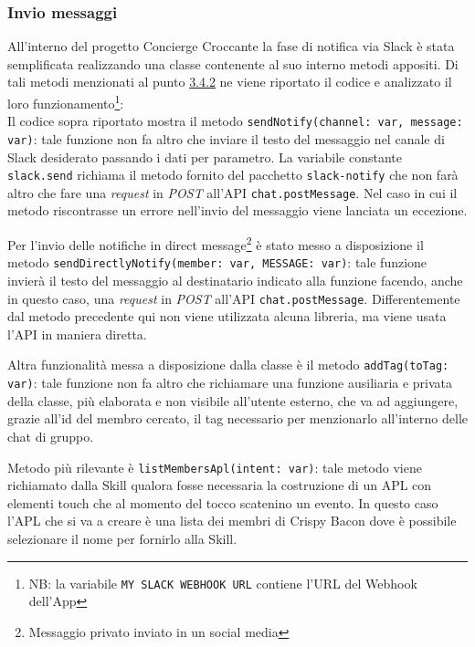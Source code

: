 \subsubsection{Invio messaggi}
All'interno del progetto Concierge Croccante la fase di notifica via Slack è stata semplificata realizzando una classe contenente al suo interno metodi appositi. Di tali metodi menzionati al punto \hyperref[utils]{3.4.2} ne viene riportato il codice e analizzato il loro funzionamento\footnote{NB: la variabile \texttt{MY SLACK WEBHOOK URL} contiene l'URL del Webhook dell'App}: 
\\[0.1cm]

Il codice sopra riportato mostra il metodo \texttt{sendNotify(channel:  var, message:  var)}: tale funzione non fa altro che inviare il testo del messaggio nel canale di Slack desiderato passando i dati per parametro. La variabile constante \texttt{slack.send} richiama il metodo fornito del pacchetto \texttt{slack-notify} che non farà altro che fare una \textit{request} in \textit{POST} all'API \texttt{chat.postMessage}. Nel caso in cui il metodo riscontrasse un errore nell'invio del messaggio viene lanciata un eccezione.

\newpage

Per l'invio delle notifiche in direct message\footnote{Messaggio privato inviato in un social media} è stato messo a disposizione il metodo \texttt{sendDirectlyNotify(member:  var, MESSAGE:  var)}: tale funzione invierà il testo del messaggio al destinatario indicato alla funzione facendo, anche in questo caso, una \textit{request} in \textit{POST} all'API \texttt{chat.postMessage}. Differentemente dal metodo precedente qui non viene utilizzata alcuna libreria, ma viene usata l'API in maniera diretta.

\newpage

Altra funzionalità messa a disposizione dalla classe è il metodo \texttt{addTag(toTag: var)}: tale funzione non fa altro che richiamare una funzione ausiliaria e privata della classe, più elaborata e non visibile all'utente esterno, che va ad aggiungere, grazie all'id del membro cercato, il tag necessario per menzionarlo all'interno delle chat di gruppo.

\newpage

Metodo più rilevante è \texttt{listMembersApl(intent: var)}: tale metodo viene richiamato dalla Skill qualora fosse necessaria la costruzione di un APL con elementi touch che al momento del tocco scatenino un evento. In questo caso l'APL che si va a creare è una lista dei membri di Crispy Bacon dove è possibile selezionare il nome per fornirlo alla Skill. 

